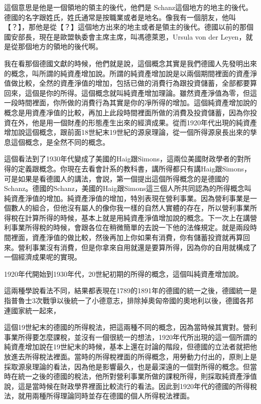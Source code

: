 \documentclass[oneside,sub3section]{ctexbook}
\begin{document}
這個意思是他是一個領地的領主的後代，他們是 Schanz這個地方的地主的後代。德國的名字跟姓氏，姓氏通常是按職業或者是地名。像我有一個朋友，他叫【？】，那他是從【？】這個地方出來的地主或者是領主的後代。德國以前的那個國安部長，現在是歐盟執委會主席主席，叫馮德萊恩，Ursula von der Leyen，就是從那個地方的領地的後代啊。

我在看那個德國文獻的時候，他們就是說，這個概念其實是我們德國人先發明出來的概念，叫所謂的純資產增加說。所謂的純資產增加說是以兩個期間裡面的資產淨值做比較，全然的資產淨值的增加，包括已做的消費行為跟投資儲蓄，全部都要算回來，這個是你的所得。這個概念就叫純資產增加理論。雖然資產淨值為零，但這一段時間裡面，你所做的消費行為其實是你的凈所得的增加。這個純資產增加說的概念是用資產凈值的比較，再加上此段時間裡面所做的消費及投資儲蓄，因為你投資在外，他是用一個財產的形態產生出來的經濟成果。從而1920年代出現的純資產增加說這個概念，跟前面18世紀末19世紀的源泉理論，從一個所得源泉長出來的孳息這個概念，是全然不同的概念。

這個看法到了1930年代變成了美國的Haig跟Simons，這兩位美國財政學者的對所得的定義跟概念。你現在去看會計系的教科書，講所得都只有講Haig跟Simons，可是如果是看德國人的講法，會説，第一個提出這個所得概念的是德國的Schanz。德國的Schanz，美國的Haig跟Simons這三個人所共同認為的所得概念叫純資產淨值的增加。純資產淨值的增加，特別表現在營利事業。因為營利事業是一個數人的組合，但他沒有屬人的像你我一樣的自然人實體的存在，所以營利事業所得稅在計算所得的時候，基本上就是用純資產淨值增加說的概念。下一次上在講營利事業所得稅的時候，會跟各位在稍微簡單的去說一下他的法條規定。就是兩段時間裡面，資產淨值的做比較，然後再加上你如果有消費，你有儲蓄投資就再算回來。營利事業沒有消費，但是你拿來自用就還是要算所得，因為你的自用就構成了一個經濟成果呢的實現。

1920年代開始到1930年代，20世紀初期的所得的概念，這個叫純資產增加說。

這兩種學說看法不同，結果都表現在1789的1891年的德國的統一之後，德國統一是指普魯士3次戰爭以後統一了小德意志，排除掉奧匈帝國的奧地利以後，德國各邦連國家統一起來，

這個19世紀末的德國的所得稅法，把這兩種不同的概念，因為當時候其實對。營利事業所得要怎麼課稅，並沒有一個很統一的想法，1920年代所出現的這一個所謂的純資產增加說在19世紀末的時候，基本上還在討論的階段，但德國的立法者就把他放進去所得稅法裡面。當時的所得稅裡面的所得概念，用勞動力付出的，原則上是採取源泉理論的看法，因為他是影響最久，也是最深遠的一個對所得的概念。但當時在統一之後的德國的稅法，他所對營利事業所做的課稅所得，則採取純資產淨值說，這是當時候在財政學界裡面比較流行的看法。因此到1920年代的德國的所得稅法，就用兩種所得理論同時並存在德國的個人所得稅法裡面。
\end{document}
